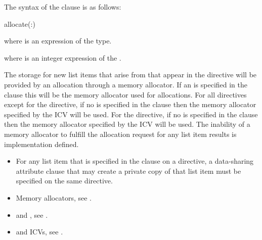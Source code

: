 \syntax

The syntax of the  clause is as follows:

\begin{boxedcode}
allocate(\plc{[allocator}:\plc{] list})
\end{boxedcode}

\begin{ccppspecific}
where  is an expression of the  type.
\end{ccppspecific}
\begin{fortranspecific}
where  is an integer expression of the  .
\end{fortranspecific}

\descr

The storage for new list items that arise from  that appear in the directive will be provided by an allocation through a memory allocator. If an  is specified in the clause this will be the memory allocator used for allocations. For all directives except for the  directive, if no  is specified in the clause then the memory allocator specified by the  ICV will be used. For the  directive, if no  is specified in the clause then the memory allocator specified by the  ICV will be used. The inability of a memory allocator to fulfill the allocation request for any list item results is implementation defined.

\restrictions
\begin{itemize}
\item For any list item that is specified in the  clause on a directive, a data-sharing attribute clause that may create a private copy of that list item must be specified on the same directive.
\end{itemize}

\crossreferences
\begin{itemize}
\item Memory allocators, see .
\item {} and , see .
\item {} and  ICVs, see .
\end{itemize}
